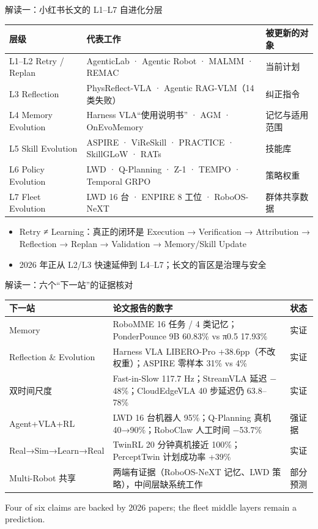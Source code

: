 \documentclass[aspectratio=169,10pt]{beamer}
\newcommand{\con}[1]{\textcolor{negative}{#1}}
\newcommand{\HL}[1]{\textcolor{emphasis}{#1}}
\newcommand{\en}[1]{{\footnotesize\textcolor{neutral}{#1}}}
\begin{document}
\begin{frame}{解读一：小红书长文的 L1--L7 自进化分层}
\begin{center}
\vspace{4pt}
\small
\begin{tabular}{@{}lll@{}}
\toprule
层级 & 代表工作 & 被更新的对象 \\
\midrule
L1--L2 Retry / Replan & AgenticLab · Agentic Robot · MALMM · REMAC & 当前计划 \\
L3 Reflection & PhysReflect-VLA · Agentic RAG-VLM（14 类失败） & 纠正指令 \\
L4 Memory Evolution & Harness VLA“使用说明书” · AGM · OnEvoMemory & 记忆与适用范围 \\
L5 Skill Evolution & ASPIRE · ViReSkill · PRACTICE · SkillGLoW · RATs & 技能库 \\
L6 Policy Evolution & LWD · Q-Planning · Z-1 · TEMPO · Temporal GRPO & 策略权重 \\
L7 Fleet Evolution & LWD 16 台 · ENPIRE 8 工位 · RoboOS-NeXT & 群体共享数据 \\
\bottomrule
\end{tabular}
\end{center}
\begin{itemize}
  \item Retry ≠ Learning：真正的闭环是 Execution → Verification → Attribution → Reflection → Replan → Validation → Memory/Skill Update
  \item 2026 年正从 L2/L3 快速延伸到 L4--L7；\con{长文的盲区是治理与安全}
\end{itemize}
\end{frame}

\begin{frame}{解读一：六个“下一站”的证据核对}
\begin{center}
\vspace{4pt}
\small
\begin{tabular}{@{}p{2.5cm}p{8.1cm}l@{}}
\toprule
下一站 & 论文报告的数字 & 状态 \\
\midrule
Memory & RoboMME 16 任务 / 4 类记忆；PonderPounce 9B 60.83\% vs π0.5 17.93\% & \HL{实证} \\
Reflection \& Evolution & Harness VLA LIBERO-Pro +38.6pp（不改权重）；ASPIRE 零样本 31\% vs 4\% & \HL{实证} \\
双时间尺度 & Fast-in-Slow 117.7 Hz；StreamVLA 延迟 $-$48\%；CloudEdgeVLA 40 步延迟仍 63.8--78\% & \HL{实证} \\
Agent+VLA+RL & LWD 16 台机器人 95\%；Q-Planning 真机 40→90\%；RoboClaw 人工时间 $-$53.7\% & \HL{强证据} \\
Real→Sim→Learn→Real & TwinRL 20 分钟真机接近 100\%；PerceptTwin 计划成功率 +39\% & \HL{实证} \\
Multi-Robot 共享 & 两端有证据（RoboOS-NeXT 记忆、LWD 策略），中间层缺系统工作 & \con{部分预测} \\
\bottomrule
\end{tabular}
\end{center}
\en{Four of six claims are backed by 2026 papers; the fleet middle layers remain a prediction.}
\end{frame}
\end{document}

